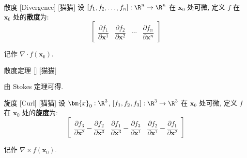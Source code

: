 \documentclass[UTF8]{ctexart}
\begin{document}
			\begin{dfn}
				[Divergence]
				{散度}
				[Divergence]
				[猫猫]
				设 \([f_1,f_2,\dots,f_n]:\R^n\to\R^n\) 在 \(\bm{x}_0\) 处可微, 定义 \(f\) 在 \(\bm{x}_0\) 处的\textbf{散度}为: 
				\[
				\begin{bmatrix}
					\dfrac{\partial f_1}{\partial \bm{x}^1} &
					\dfrac{\partial f_2}{\partial \bm{x}^2} &
					\cdots &
					\dfrac{\partial f_n}{\partial \bm{x}^n}
				\end{bmatrix}
				\]

				记作 \(\nabla\cdot f(\bm{x}_0)\).
			\end{dfn}
			
			\begin{thm}
				[]
				{散度定理}
				[]
				[猫猫]
			\end{thm}
			
			\begin{prf}
				由 Stokes 定理可得. 
			\end{prf}
			
			\begin{dfn}
				[]
				{旋度}
				[Curl]
				[猫猫]
				设 \(\bm{x}_0:\R^3\), \([f_1,f_2,f_3]:\R^3\to\R^3\) 在 \(\bm{x}_0\) 处可微, 定义 \(f\) 在 \(\bm{x}_0\) 处的\textbf{旋度}为: 
				\[
				\begin{bmatrix}
					\dfrac{\partial f_3}{\partial \bm{x}^2}-\dfrac{\partial f_2}{\partial \bm{x}^3} & 
					\dfrac{\partial f_1}{\partial \bm{x}^3}-\dfrac{\partial f_3}{\partial \bm{x}^1} &
					\dfrac{\partial f_2}{\partial \bm{x}^1}-\dfrac{\partial f_1}{\partial \bm{x}^2}
				\end{bmatrix}
				\]

				记作 \(\nabla\times f(\bm{x}_0)\). 
			\end{dfn}
\end{document}
